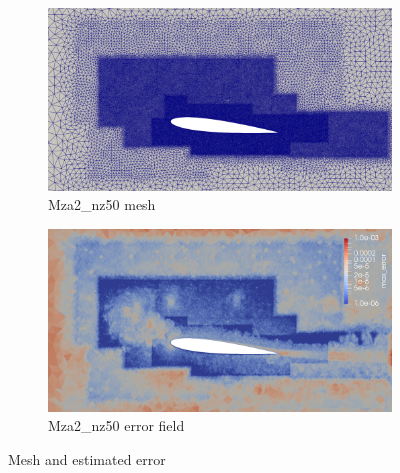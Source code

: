 \begin{figure}[H]
	
	\begin{subfigure}[b]{0.475\textwidth}
		\centering
		\includegraphics[width=1\textwidth]{figures/zonal_adapt_results/Mesh_and_error_plots_Re200k/Mza2_inplane.png}
		\caption{Mza2\_nz50 mesh}
		\label{fig:zonal_Mza2_mesh_Re200k}
	\end{subfigure}
	\begin{subfigure}[b]{0.475\textwidth}
		\centering
		\includegraphics[width=1\textwidth]{figures/zonal_adapt_results/Mesh_and_error_plots_Re200k/Mza2_error.png}
		\caption{Mza2\_nz50 error field}
		\label{fig:zonal_Mza2_error_Re200k}
	\end{subfigure}
	
	\caption{Mesh and estimated error}
\end{figure}
